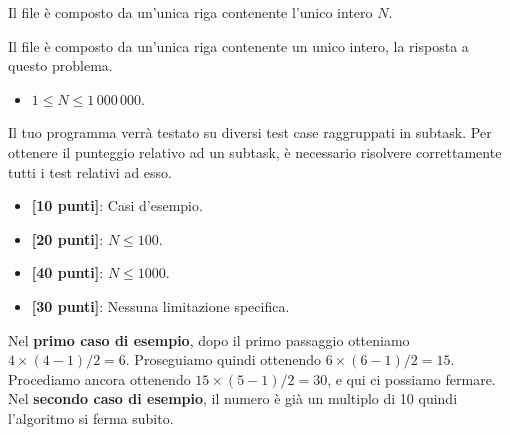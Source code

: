 \InputFile
Il file  è composto da un'unica riga contenente l'unico intero $N$.

\OutputFile
Il file \outputfile{} è composto da un'unica riga contenente un unico intero, la risposta a questo problema.

\Constraints
\begin{itemize}[nolistsep, itemsep=2mm]
	\item $1 \le N \le 1\,000\,000$.
\end{itemize}

\Scoring
Il tuo programma verrà testato su diversi test case raggruppati in subtask.
Per ottenere il punteggio relativo ad un subtask, è necessario risolvere
correttamente tutti i test relativi ad esso.

\begin{itemize}[nolistsep,itemsep=2mm]
  \item \textbf{ [10 punti]}: Casi d'esempio.
  \item \textbf{ [20 punti]}: $N \leq 100$.
  \item \textbf{ [40 punti]}: $N \leq 1000$.
  \item \textbf{ [30 punti]}: Nessuna limitazione specifica.
\end{itemize}

\Examples
\begin{example}
%
\end{example}
\begin{example}
%
\end{example}


\Explanation
Nel \textbf{primo caso di esempio}, dopo il primo passaggio otteniamo $4 \times (4-1)/2 = 6$. Proseguiamo quindi ottenendo $6 \times (6-1)/2 = 15$. Procediamo ancora ottenendo $15 \times (5-1)/2 = 30$, e qui ci possiamo fermare. \\[2mm]
Nel \textbf{secondo caso di esempio}, il numero è già un multiplo di 10 quindi l'algoritmo si ferma subito.
